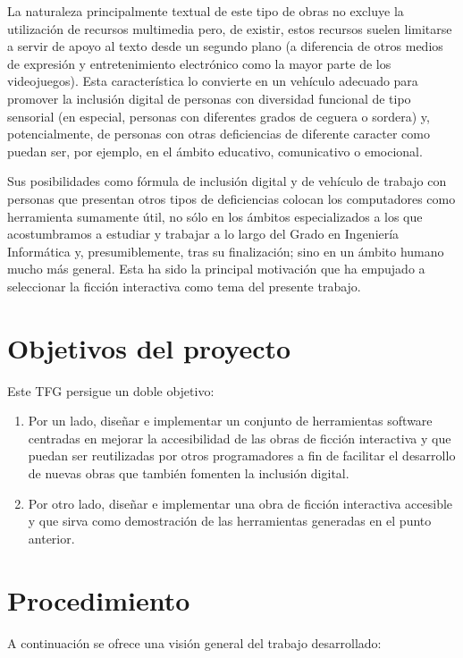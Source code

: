 La naturaleza principalmente textual de este tipo de obras no excluye la utilización de recursos multimedia pero, de existir, estos recursos suelen limitarse a servir de apoyo al texto desde un segundo plano (a diferencia de otros medios de expresión y entretenimiento electrónico como la mayor parte de los videojuegos). Esta característica lo convierte en un vehículo adecuado para promover la inclusión digital de personas con diversidad funcional de tipo sensorial (en especial, personas con diferentes grados de ceguera o sordera) y, potencialmente, de personas con otras deficiencias de diferente caracter como puedan ser, por ejemplo, en el ámbito educativo, comunicativo o emocional.

Sus posibilidades como fórmula de inclusión digital y de vehículo de trabajo con personas que presentan otros tipos de deficiencias colocan los computadores como herramienta sumamente útil, no sólo en los ámbitos especializados a los que acostumbramos a estudiar y trabajar a lo largo del Grado en Ingeniería Informática y, presumiblemente, tras su finalización; sino en un ámbito humano mucho más general. Esta ha sido la principal motivación que ha empujado a seleccionar la ficción interactiva como tema del presente trabajo.

\section{Objetivos del proyecto}

Este TFG persigue un doble objetivo:

\begin{enumerate}
	\item Por un lado, diseñar e implementar un conjunto de herramientas software centradas en mejorar la accesibilidad de las obras de ficción interactiva y que puedan ser reutilizadas por otros programadores a fin de facilitar el desarrollo de nuevas obras que también fomenten la inclusión digital.

	\item Por otro lado, diseñar e implementar una obra de ficción interactiva accesible y que sirva como demostración de las herramientas generadas en el punto anterior.
\end{enumerate}

\section{Procedimiento}

A continuación se ofrece una visión general del trabajo desarrollado:

